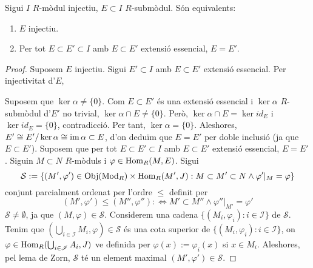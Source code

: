 \begin{lema}\label{equivalent-injectiu}
    Sigui $I$ $R$-mòdul injectiu, $E\subset I$ $R$-submòdul. Són equivalents:
    \begin{enumerate}
        \item $E$ injectiu.
        \item Per tot $E\subset E'\subset I$ amb $E\subset E'$ extensió essencial, $E=E'$.
    \end{enumerate}
    \begin{proof}
        Suposem $E$ injectiu. Sigui $E'\subset I$ amb $E\subset E'$ extensió essencial. Per injectivitat d'$E$,
        \begin{center}
        \end{center}
        Suposem que $\ker{\alpha}\neq\{0\}$. Com $E\subset E'$ és una extensió essencial i $\ker{\alpha}$ $R$-submòdul d'$E'$ no trivial, $\ker{\alpha}\cap E\neq\{0\}$. Però, $\ker{\alpha}\cap E=\ker{id_{E}}$ i $\ker{id_{E}}=\{0\}$, contradicció. Per tant, $\ker{\alpha}=\{0\}$. Aleshores, $E'\cong E'/\ker{\alpha}\cong\operatorname{im}{\alpha}\subset E$, d'on deduïm que $E=E'$ per doble inclusió (ja que $E\subset E'$).\newline
        Suposem que per tot $E\subset E'\subset I$ amb $E\subset E'$ extensió essencial, $E=E'$. Siguin $M\subset N$ $R$-mòduls i $\varphi\in\operatorname{Hom}_{R}(M,E)$. Sigui
        \begin{equation*}
            \mathcal{S}:=\{(M',\varphi')\in\operatorname{Obj}(\textrm{Mod}_{R})\times\operatorname{Hom}_{R}(M',J):M\subset M'\subset N\land\varphi'|_{M}=\varphi\}
        \end{equation*}
        conjunt parcialment ordenat per l'ordre $\leq$ definit per
        \begin{equation*}
            (M',\varphi')\leq(M'',\varphi''):\iff M'\subset M''\land\varphi''|_{M'}=\varphi'
        \end{equation*}
        $\mathcal{S}\neq\emptyset$, ja que $(M,\varphi)\in\mathcal{S}$. Considerem una cadena $\{(M_{i},\varphi_{i}):i\in\mathscr{I}\}$ de $\mathcal{S}$. Tenim que $(\bigcup_{i\in\mathscr{I}}M_{i},\varphi)\in\mathcal{S}$ és una cota superior de $\{(M_{i},\varphi_{i}):i\in\mathscr{I}\}$, on $\varphi\in\operatorname{Hom}_{R}(\bigcup_{i\in\mathscr{I}}A_{i},J)$ ve definida per $\varphi(x):=\varphi_{i}(x)$ si $x\in M_{i}$. Aleshores, pel lema de Zorn, $\mathcal{S}$ té un element maximal $(M',\varphi')\in\mathcal{S}$.\newline

\end{proof}
\end{lema}
